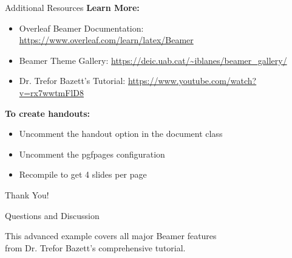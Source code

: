 \documentclass[aspectratio=169]{beamer}
\begin{document}
\begin{frame}{Additional Resources}
  \textbf{Learn More:}
  \begin{itemize}
    \item Overleaf Beamer Documentation: \url{https://www.overleaf.com/learn/latex/Beamer}
    \item Beamer Theme Gallery: \url{https://deic.uab.cat/~iblanes/beamer_gallery/}
    \item Dr. Trefor Bazett's Tutorial: \url{https://www.youtube.com/watch?v=rx7wwtmFlD8}
  \end{itemize}
  
  \vspace{0.5cm}
  
  \textbf{To create handouts:}
  \begin{itemize}
    \item Uncomment the handout option in the document class
    \item Uncomment the pgfpages configuration
    \item Recompile to get 4 slides per page
  \end{itemize}
\end{frame}

\begin{frame}
  \begin{center}
    {\Huge Thank You!}
    
    \vspace{1cm}
    
    {\Large Questions and Discussion}
    
    \vspace{1cm}
    
    \small
    This advanced example covers all major Beamer features\\
    from Dr. Trefor Bazett's comprehensive tutorial.
  \end{center}
\end{frame}
\end{document}
